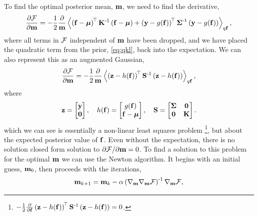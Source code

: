 \documentclass{article} %
\begin{document}
To find the optimal posterior mean, $\pomean$, we need to find the derivative,
\begin{equation}
    \frac{\partial\Fengy}{\partial\pomean} = -\frac{1}{2}
    \frac{\partial}{\pomean} \expec{q\lstate}{
        \brac{\lstate - \prmean}\transpose\prcov\inv
        \brac{\lstate - \prmean}
        + \brac{\obs - \nonlin{\lstate}}\transpose \lcov\inv
            \brac{\obs - \nonlin{\lstate}}},
\end{equation}
where all terms in $\Fengy$ independent of $\pomean$ have been dropped, and we
have placed the quadratic term from the prior, \eqref{eq:qkl}, back into the
expectation. We can also represent this as an augmented Gaussian,
\begin{equation}
    \frac{\partial\Fengy}{\partial\pomean} = -\frac{1}{2}
        \frac{\partial}{\pomean}
        \expec{q\lstate}{
        \brac{\augobs - \augnonlin{\lstate}}\transpose\augcov\inv
        \brac{\augobs - \augnonlin{\lstate}}
    },
    \label{eq:augsys}
\end{equation}
where
\begin{equation}
    \augobs = \begin{bmatrix} \obs \\ \mathbf{0} \end{bmatrix}, \quad
    \augnonlin{\lstate} = \begin{bmatrix} \nonlin{\lstate} \\ \lstate - \prmean 
        \end{bmatrix}, \quad
    \augcov = \begin{bmatrix} \lcov & \mathbf{0} \\ \mathbf{0} & \prcov 
        \end{bmatrix}.
\end{equation}
which we can see is essentially a non-linear least squares problem\!
\footnote{$-\frac{1}{2}
        \frac{\partial}{\partial\lstate}
        \brac{\augobs - \augnonlin{\lstate}}\transpose\augcov\inv
        \brac{\augobs - \augnonlin{\lstate}} = 0$.}, but about
the expected posterior value of $\lstate$. Even without the expectation, there
is no solution closed form solution to $\partial\Fengy/\partial\pomean = 0$.
To find a solution to this problem for the optimal $\pomean$ we can use the
Newton algorithm. It begins with an initial guess, $\pomean_0$, then proceeds
with the iterations,
\begin{equation}
    \pomean_{k+1} = \pomean_k -
    \step\brac{\nabla_\pomean\nabla_\pomean\Fengy}\inv \nabla_\pomean\Fengy,
    \label{eq:newton}
\end{equation}
\end{document}

